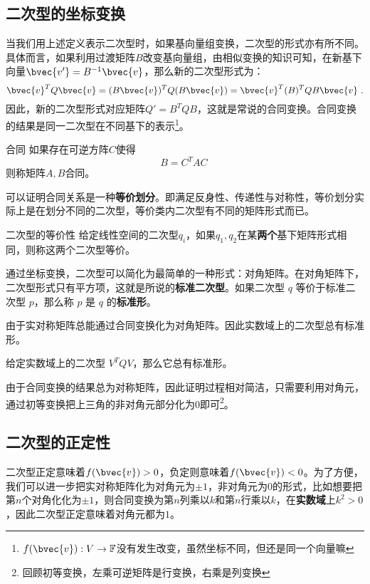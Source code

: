 \subsection{二次型的坐标变换}
当我们用上述定义表示二次型时，如果基向量组变换，二次型的形式亦有所不同。具体而言，如果利用过渡矩阵$B$改变基向量组，由相似变换的知识可知，在新基下向量$\bvec{v'}=B^{-1}\bvec{v}$，那么新的二次型形式为：
\begin{equation}
\bvec{v}^T Q\bvec{v}=(B\bvec{v})^T Q(B\bvec{v})=\bvec{v}^T (B)^{T}QB\bvec{v}~.
\end{equation}
因此，新的二次型形式对应矩阵$Q'=B^{T}QB$，这就是常说的合同变换。合同变换的结果是同一二次型在不同基下的表示\footnote{$f(\bvec{v}):V\rightarrow \mathbb F$没有发生改变，虽然坐标不同，但还是同一个向量嘛}。
\begin{definition}{合同}
如果存在可逆方阵$C$使得
\begin{equation}
B=C^T AC~
\end{equation}
则称矩阵$A,B$合同。
\end{definition}
可以证明合同关系是一种\textbf{等价划分}。即满足反身性、传递性与对称性，等价划分实际上是在划分不同的二次型，等价类内二次型有不同的矩阵形式而已。

\begin{definition}{二次型的等价性}
给定线性空间的二次型$q_i$，如果$q_1,q_2$在某\textbf{两个}基下矩阵形式相同，则称这两个二次型等价。
\end{definition}

通过坐标变换，二次型可以简化为最简单的一种形式：对角矩阵。在对角矩阵下，二次型形式只有平方项，这就是所说的\textbf{标准二次型}。如果二次型 $q$
等价于标准二次型 $p$，那么称 $p$ 是 $q$ 的\textbf{标准形}。

由于实对称矩阵总能通过合同变换化为对角矩阵。因此实数域上的二次型总有标准形。
\begin{theorem}{}
给定实数域上的二次型 $V^T QV$，那么它总有标准形。
\end{theorem}
由于合同变换的结果总为对称矩阵，因此证明过程相对简洁，只需要利用对角元，通过初等变换把上三角的非对角元部分化为0即可\footnote{回顾初等变换，左乘可逆矩阵是行变换，右乘是列变换}。
\subsection{二次型的正定性}
二次型正定意味着$f(\bvec{v})>0$，负定则意味着$f(\bvec{v})< 0$。为了方便，我们可以进一步把实对称矩阵化为对角元为$\pm 1$，非对角元为$0$的形式，比如想要把第$n$个对角化化为$\pm 1$，则合同变换为第$n$列乘以$k$和第$n$行乘以$k$，在\textbf{实数域}上$k^2>0$，因此二次型正定意味着对角元都为$1$。

